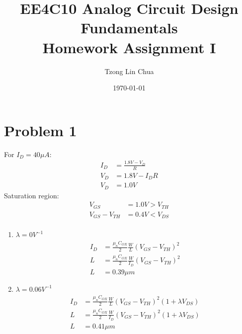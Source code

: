 \documentclass{article}
\author{Tzong Lin Chua}
\date{\today}
\title{EE4C10 Analog Circuit Design Fundamentals\\\medskip
\large Homework Assignment I }
\begin{document}
\maketitle
\tableofcontents


\section{Problem 1}
\label{sec:org2869a93}
For \(I_{D} = 40 \mu{}A\):
\begin{equation*}
\begin{aligned}
I_{D} &= \frac{1.8V - V_{D}}{R} \\
V_{D} &= 1.8V - I_{D}R \\
V_{D} &= 1.0V
\end{aligned}
\end{equation*}
Saturation region:
\begin{equation*}
\begin{aligned}
V_{GS} &= 1.0V > V_{TH} \\
V_{GS} - V_{TH}&= 0.4V < V_{DS} \\
\end{aligned}
\end{equation*}

\begin{enumerate}
\item \(\lambda = 0 V^{-1}\)
\begin{equation*}
\begin{aligned}
I_{D} &= \frac{\mu_{n}C_{OX}}{2}\frac{W}{L}(V_{GS} - V_{TH})^{2} \\
L &= \frac{\mu_{n}C_{OX}}{2}\frac{W}{I_{D}}(V_{GS} - V_{TH})^{2} \\
L &= 0.39 \mu{}m
\end{aligned}
\end{equation*}

\item \(\lambda = 0.06 V^{-1}\)
\begin{equation*}
\begin{aligned}
I_{D} &= \frac{\mu_{n}C_{OX}}{2}\frac{W}{L}(V_{GS} - V_{TH})^{2}(1 + \lambda{}V_{DS}) \\
L &= \frac{\mu_{n}C_{OX}}{2}\frac{W}{I_{D}}(V_{GS} - V_{TH})^{2}(1 + \lambda{}V_{DS}) \\
L &= 0.41 \mu{}m
\end{aligned}
\end{equation*}
\end{enumerate}
\end{document}
